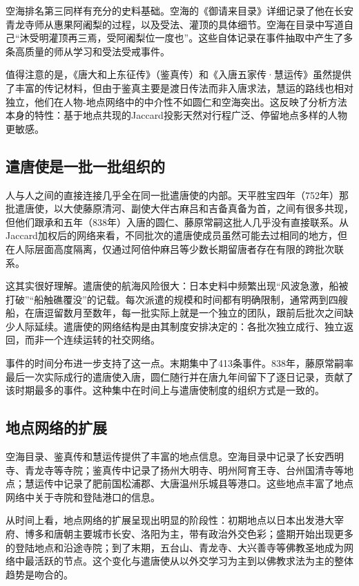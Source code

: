 \documentclass[12pt,a4paper]{article}
\begin{document}
空海排名第三同样有充分的史料基础。空海的《御请来目录》详细记录了他在长安青龙寺师从惠果阿阇梨的过程，以及受法、灌顶的具体细节。空海在目录中写道自己“沐受明灌顶再三焉，受阿阇梨位一度也”。这些自体记录在事件抽取中产生了多条高质量的师从学习和受法受戒事件。

值得注意的是，《唐大和上东征传》（鉴真传）和《入唐五家传·慧运传》虽然提供了丰富的传记材料，但由于鉴真主要是渡日传法而非入唐求法，慧运的路线也相对独立，他们在人物-地点网络中的中介性不如圆仁和空海突出。这反映了分析方法本身的特性：基于地点共现的Jaccard投影天然对行程广泛、停留地点多样的人物更敏感。

\subsection{遣唐使是一批一批组织的}

人与人之间的直接连接几乎全在同一批遣唐使的内部。天平胜宝四年（752年）那批遣唐使，以大使藤原清河、副使大伴古麻吕和吉备真备为首，之间有很多共现，但他们跟承和五年（838年）入唐的圆仁、藤原常嗣这批人几乎没有直接联系。从Jaccard加权后的网络来看，不同批次的遣唐使成员虽然可能去过相同的地方，但在人际层面高度隔离，仅通过阿倍仲麻吕等少数长期留唐者存在有限的跨批次联系。

这其实很好理解。遣唐使的航海风险很大：日本史料中频繁出现“风波急激，船被打破”“船触礁覆没”的记载。每次派遣的规模和时间都有明确限制，通常两到四艘船，在唐逗留数月至数年，每一批实际上就是一个独立的团队，跟前后批次之间缺少人际延续。遣唐使的网络结构是由其制度安排决定的：各批次独立成行、独立返回，而非一个连续运转的社交网络。

事件的时间分布进一步支持了这一点。末期集中了413条事件。838年，藤原常嗣率最后一次实际成行的遣唐使入唐，圆仁随行并在唐九年间留下了逐日记录，贡献了该时期最多的事件。这种集中在时间上与遣唐使制度的组织方式是一致的。

\subsection{地点网络的扩展}

空海目录、鉴真传和慧运传提供了丰富的地点信息。空海目录中记录了长安西明寺、青龙寺等寺院；鉴真传中记录了扬州大明寺、明州阿育王寺、台州国清寺等地点；慧运传中记录了肥前国松浦郡、大唐温州乐城县等港口。这些地点丰富了地点网络中关于寺院和登陆港口的信息。

从时间上看，地点网络的扩展呈现出明显的阶段性：初期地点以日本出发港大宰府、博多和唐朝主要城市长安、洛阳为主，带有政治外交色彩；盛期开始出现更多的登陆地点和沿途寺院；到了末期，五台山、青龙寺、大兴善寺等佛教圣地成为网络中最活跃的节点。这个变化与遣唐使从以外交学习为主到以佛教求法为主的整体趋势是吻合的。
\end{document}
